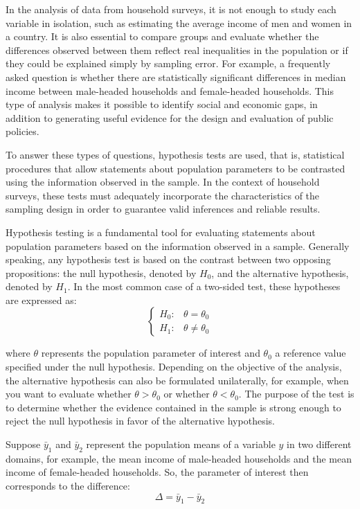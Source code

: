 \documentclass[
  english,
  12pt,
]{book}
\begin{document}
In the analysis of data from household surveys, it is not enough to study each variable in isolation, such as estimating the average income of men and women in a country. It is also essential to compare groups and evaluate whether the differences observed between them reflect real inequalities in the population or if they could be explained simply by sampling error. For example, a frequently asked question is whether there are statistically significant differences in median income between male-headed households and female-headed households. This type of analysis makes it possible to identify social and economic gaps, in addition to generating useful evidence for the design and evaluation of public policies.

To answer these types of questions, hypothesis tests are used, that is, statistical procedures that allow statements about population parameters to be contrasted using the information observed in the sample. In the context of household surveys, these tests must adequately incorporate the characteristics of the sampling design in order to guarantee valid inferences and reliable results.

Hypothesis testing is a fundamental tool for evaluating statements about population parameters based on the information observed in a sample. Generally speaking, any hypothesis test is based on the contrast between two opposing propositions: the null hypothesis, denoted by \(H_0\), and the alternative hypothesis, denoted by \(H_1\). In the most common case of a two-sided test, these hypotheses are expressed as:
\[
\begin{cases}
H_{0}: & \theta = \theta_0 \\
H_{1}: & \theta \neq \theta_0
\end{cases}
\]

where \(\theta\) represents the population parameter of interest and \(\theta_0\) a reference value specified under the null hypothesis. Depending on the objective of the analysis, the alternative hypothesis can also be formulated unilaterally, for example, when you want to evaluate whether \(\theta > \theta_0\) or whether \(\theta < \theta_0\). The purpose of the test is to determine whether the evidence contained in the sample is strong enough to reject the null hypothesis in favor of the alternative hypothesis.

Suppose \(\bar{y}_1\) and \(\bar{y}_2\) represent the population means of a variable \(y\) in two different domains, for example, the mean income of male-headed households and the mean income of female-headed households. So, the parameter of interest then corresponds to the difference:
\[
\Delta = \bar{y}_1 - \bar{y}_2
\]
\end{document}
